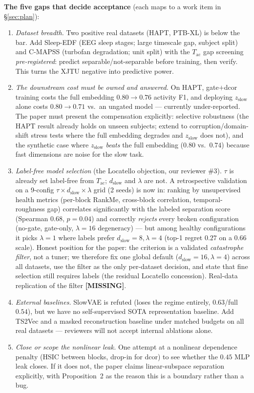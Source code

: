 \documentclass[10pt]{article}
\newcommand{\todo}{\textcolor[rgb]{0.75,0,0}{\textbf{[MISSING]}}}
\newcommand{\zslow}{z_{\mathrm{slow}}}
\begin{document}
\textbf{The five gaps that decide acceptance} (each maps to a work item in
\S\ref{sec:plan}):
\begin{enumerate}[leftmargin=1.4em,itemsep=1pt,topsep=2pt]
\item \emph{Dataset breadth.} Two positive real datasets (HAPT, PTB-XL) is
below the bar. Add Sleep-EDF (EEG sleep stages; large timescale gap, subject
split) and C-MAPSS (turbofan degradation; unit split) with the
$T_{\mathrm{ac}}$ gap screening \emph{pre-registered}: predict
separable/not-separable before training, then verify. This turns the XJTU
negative into predictive power.
\item \emph{The downstream cost must be owned and answered.} On HAPT,
gate$+$dcor training costs the full embedding $0.80\!\to\!0.76$ activity F1,
and deploying $\zslow$ alone costs $0.80\!\to\!0.71$ vs.\ an ungated model
--- currently under-reported. The paper must present the compensation
explicitly: selective robustness (the HAPT result already holds on unseen
subjects; extend to corruption/domain-shift stress tests where the full
embedding degrades and $\zslow$ does not), and the synthetic case where
$\zslow$ \emph{beats} the full embedding ($0.80$ vs.\ $0.74$) because fast
dimensions are noise for the slow task.
\item \emph{Label-free model selection} (the Locatello objection, our
reviewer \#3). $\tau$ is already set label-free from $T_{\mathrm{ac}}$;
$d_{\mathrm{slow}}$ and $\lambda$ are not. A retrospective validation on a
9-config $\tau\times d_{\mathrm{slow}}\times\lambda$ grid (2 seeds) is now
in: ranking by unsupervised health metrics (per-block RankMe, cross-block
correlation, temporal-roughness gap) correlates significantly with the
labeled separation score (Spearman $0.68$, $p{=}0.04$) and correctly
\emph{rejects} every broken configuration (no-gate, gate-only,
$\lambda{=}16$ degeneracy) --- but among healthy configurations it picks
$\lambda{=}1$ where labels prefer $d_{\mathrm{slow}}{=}8,\lambda{=}4$
(top-1 regret $0.27$ on a $0.66$ scale). Honest position for the paper:
the criterion is a validated \emph{catastrophe filter}, not a tuner; we
therefore fix one global default ($d_{\mathrm{slow}}{=}16,\lambda{=}4$)
across all datasets, use the filter as the only per-dataset decision, and
state that fine selection still requires labels (the residual Locatello
concession). Real-data replication of the filter \todo.
\item \emph{External baselines.} SlowVAE is refuted
(loses the regime entirely, $0.63$/full $0.54$), but we have no
self-supervised SOTA representation baseline. Add TS2Vec and a masked
reconstruction baseline under matched budgets on all real datasets ---
reviewers will not accept internal ablations alone.
\item \emph{Close or scope the nonlinear leak.} One attempt at a nonlinear
dependence penalty (HSIC between blocks, drop-in for dcor) to see whether the
$0.45$ MLP leak closes. If it does not, the paper claims linear-subspace
separation explicitly, with Proposition~2 as the reason this is a boundary
rather than a bug.
\end{enumerate}
\end{document}
